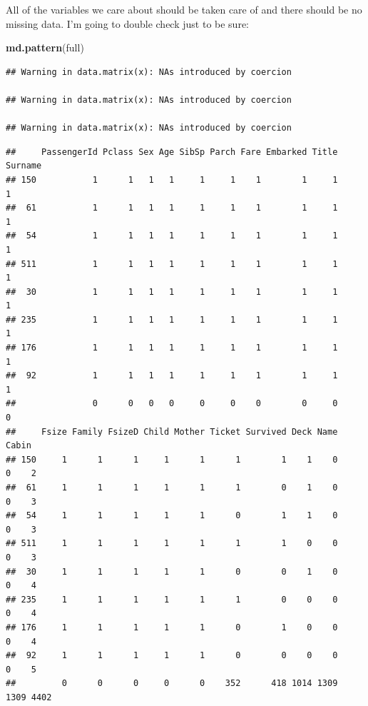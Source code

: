 \documentclass[]{book}
\newenvironment{Shaded}{\begin{snugshade}}{\end{snugshade}}
\newcommand{\KeywordTok}[1]{\textcolor[rgb]{0.13,0.29,0.53}{\textbf{#1}}}
\newcommand{\StringTok}[1]{\textcolor[rgb]{0.31,0.60,0.02}{#1}}
\newcommand{\CommentTok}[1]{\textcolor[rgb]{0.56,0.35,0.01}{\textit{#1}}}
\newcommand{\OperatorTok}[1]{\textcolor[rgb]{0.81,0.36,0.00}{\textbf{#1}}}
\newcommand{\NormalTok}[1]{#1}
\theoremstyle{definition}
\theoremstyle{definition}
\theoremstyle{definition}
\theoremstyle{remark}
\begin{document}
\begin{Shaded}
\end{Shaded}

All of the variables we care about should be taken care of and there
should be no missing data. I'm going to double check just to be sure:

\begin{Shaded}
\begin{Highlighting}[]
\KeywordTok{md.pattern}\NormalTok{(full)}
\end{Highlighting}
\end{Shaded}

\begin{verbatim}
## Warning in data.matrix(x): NAs introduced by coercion

## Warning in data.matrix(x): NAs introduced by coercion

## Warning in data.matrix(x): NAs introduced by coercion
\end{verbatim}

\begin{verbatim}
##     PassengerId Pclass Sex Age SibSp Parch Fare Embarked Title Surname
## 150           1      1   1   1     1     1    1        1     1       1
##  61           1      1   1   1     1     1    1        1     1       1
##  54           1      1   1   1     1     1    1        1     1       1
## 511           1      1   1   1     1     1    1        1     1       1
##  30           1      1   1   1     1     1    1        1     1       1
## 235           1      1   1   1     1     1    1        1     1       1
## 176           1      1   1   1     1     1    1        1     1       1
##  92           1      1   1   1     1     1    1        1     1       1
##               0      0   0   0     0     0    0        0     0       0
##     Fsize Family FsizeD Child Mother Ticket Survived Deck Name Cabin     
## 150     1      1      1     1      1      1        1    1    0     0    2
##  61     1      1      1     1      1      1        0    1    0     0    3
##  54     1      1      1     1      1      0        1    1    0     0    3
## 511     1      1      1     1      1      1        1    0    0     0    3
##  30     1      1      1     1      1      0        0    1    0     0    4
## 235     1      1      1     1      1      1        0    0    0     0    4
## 176     1      1      1     1      1      0        1    0    0     0    4
##  92     1      1      1     1      1      0        0    0    0     0    5
##         0      0      0     0      0    352      418 1014 1309  1309 4402
\end{verbatim}
\end{document}
